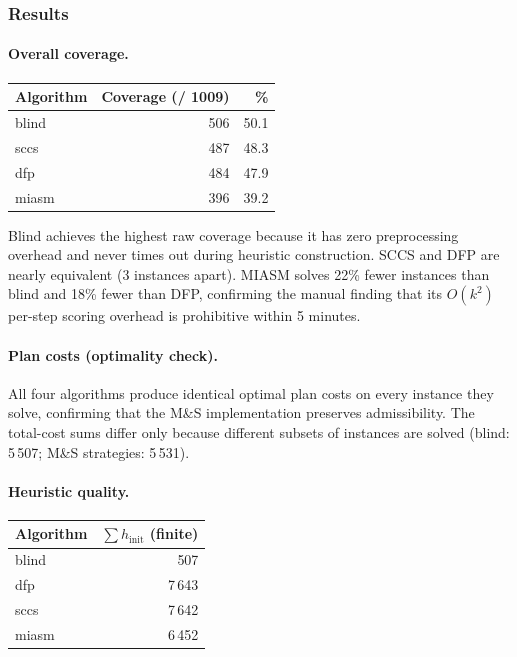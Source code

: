 \documentclass[11pt,a4paper]{article}
\begin{document}
\subsubsection{Results}

\paragraph{Overall coverage.}

\begin{center}
\small
\begin{tabular}{lrr}
\toprule
\textbf{Algorithm} & \textbf{Coverage (/ 1009)} & \textbf{\%} \\
\midrule
blind  & 506 & 50.1 \\
sccs   & 487 & 48.3 \\
dfp    & 484 & 47.9 \\
miasm  & 396 & 39.2 \\
\bottomrule
\end{tabular}
\end{center}

Blind achieves the highest raw coverage because it has zero preprocessing
overhead and never times out during heuristic construction.  SCCS and DFP
are nearly equivalent (3 instances apart).  MIASM solves 22\% fewer instances
than blind and 18\% fewer than DFP, confirming the manual finding that its
$O(k^2)$ per-step scoring overhead is prohibitive within 5 minutes.

\paragraph{Plan costs (optimality check).}
All four algorithms produce identical optimal plan costs on every instance
they solve, confirming that the M\&S implementation preserves admissibility.
The total-cost sums differ only because different subsets of instances are
solved (blind: 5\,507; M\&S strategies: 5\,531).

\paragraph{Heuristic quality.}

\begin{center}
\small
\begin{tabular}{lr}
\toprule
\textbf{Algorithm} & $\boldsymbol{\sum} h_{\mathrm{init}}$ (finite) \\
\midrule
blind  &     507 \\
dfp    & 7\,643 \\
sccs   & 7\,642 \\
miasm  & 6\,452 \\
\bottomrule
\end{tabular}
\end{center}
\end{document}
